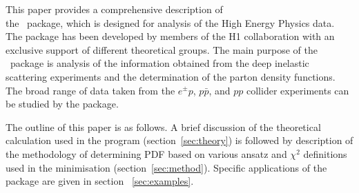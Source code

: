 
This paper provides a comprehensive description of  \\
the \fitter\ package,
which is designed for analysis of the High Energy Physics data.
The package has been developed by members of the H1 collaboration
with an exclusive support of different theoretical groups.
The main purpose of the \fitter\ package is analysis of the information
obtained from the deep inelastic scattering experiments
and the determination of the parton density functions.
The broad range of data taken from the $e^{\pm}p$, $p\bar{p}$, and $pp$ collider experiments can be
studied by the package. 

The outline of this paper is as follows.
A brief discussion of the theoretical calculation
used in the program (section~\ref{sec:theory}) is followed by description of the 
methodology of determining PDF  based on various ansatz and  $\chi^2$ definitions used in the
minimisation (section~\ref{sec:method}). Specific applications of the package are given in
section ~\ref{sec:examples}. 

